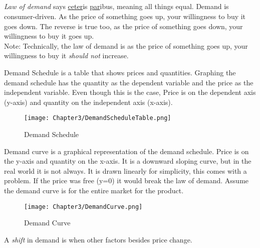 \subsection{}

\begin{definition}
    \emph{Law of demand} says \underline{ceter}is \underline{par}ibus, meaning all things equal. Demand is consumer-driven.
    As the price of something goes up, your willingness to buy it goes down. The reverse is true too,
    as the price of something goes down, your willingness to buy it goes up.\\
    Note: Technically, the law of demand is as the price of something goes up, your willingness to buy it \emph{should not} increase.
\end{definition}
\begin{definition}
    Demand Schedule is a table that shows prices and quantities. Graphing the demand schedule has the 
    quantity as the dependent variable and the price as the independent variable. Even though this is the case,
    Price is on the dependent axis (y-axis) and quantity on the independent axis (x-axis).
\end{definition}
\begin{figure}[h!]
    \centering
    \texttt{[image: Chapter3/DemandScheduleTable.png]}
    \caption{Demand Schedule}
\end{figure}
\begin{definition}
    Demand curve is a graphical representation of the demand schedule. Price is on the y-axis and quantity on the x-axis.
    It is a downward sloping curve, but in the real world it is not always. It is drawn linearly for simplicity, this comes with a problem.
    If the price was free (y=0) it would break the law of demand. Assume the demand curve is for the entire market for the product.
\end{definition}
\begin{figure}[h!]
    \centering
    \texttt{[image: Chapter3/DemandCurve.png]}
    \caption{Demand Curve}
\end{figure}
\begin{definition}
    A \emph{shift} in demand is when other factors besides price change.
\end{definition}
